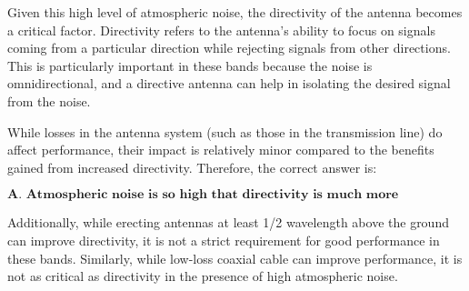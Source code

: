 Given this high level of atmospheric noise, the directivity of the antenna becomes a critical factor. Directivity refers to the antenna's ability to focus on signals coming from a particular direction while rejecting signals from other directions. This is particularly important in these bands because the noise is omnidirectional, and a directive antenna can help in isolating the desired signal from the noise.

While losses in the antenna system (such as those in the transmission line) do affect performance, their impact is relatively minor compared to the benefits gained from increased directivity. Therefore, the correct answer is:

\[
\textbf{A. Atmospheric noise is so high that directivity is much more important than losses}
\]

Additionally, while erecting antennas at least 1/2 wavelength above the ground can improve directivity, it is not a strict requirement for good performance in these bands. Similarly, while low-loss coaxial cable can improve performance, it is not as critical as directivity in the presence of high atmospheric noise.

